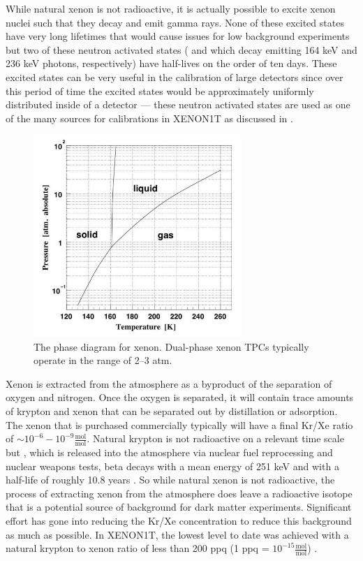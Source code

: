 While natural xenon is not radioactive, it is actually possible to excite xenon nuclei such that they decay and emit gamma rays.  None of these excited states have very long lifetimes that would cause issues for low background experiments but two of these neutron activated states ( and  which decay emitting 164 keV and 236 keV photons, respectively) have half-lives on the order of ten days.  These excited states can be very useful in the calibration of large detectors since over this period of time the excited states would be approximately uniformly distributed inside of a detector \cite{ni2007preparation} --- these neutron activated states are used as one of the many sources for calibrations in XENON1T as discussed in .

\begin{figure}[t]
	\centering
	\includegraphics[width=0.7\textwidth]{xe_pt_diagram}
	\caption{The phase diagram for xenon.  Dual-phase xenon TPCs typically operate in the range of 2--3 atm.}
	\label{fig:xe_phase_diagram}
\end{figure}

Xenon is extracted from the atmosphere as a byproduct of the separation of oxygen and nitrogen.  Once the oxygen is separated, it will contain trace amounts of krypton and xenon that can be separated out by distillation or adsorption.  The xenon that is purchased commercially typically will have a final Kr/Xe ratio of $\sim 10^{-6} - 10^{-9} \frac{\textrm{mol}}{\textrm{mol}}$.  Natural krypton is not radioactive on a relevant time scale but , which is released into the atmosphere via nuclear fuel reprocessing and nuclear weapons tests, beta decays with a mean energy of 251 keV and with a half-life of roughly 10.8 years \cite{abe2009distillation}.  So while natural xenon is not radioactive, the process of extracting xenon from the atmosphere does leave a radioactive isotope that is a potential source of background for dark matter experiments.  Significant effort has gone into reducing the Kr/Xe concentration to reduce this background as much as possible.  In XENON1T, the lowest level to date was achieved with a natural krypton to xenon ratio of less than 200 ppq (1 ppq = $10^{-15} \frac{\textrm{mol}}{\textrm{mol}}$) \cite{aprile2017removing}.



